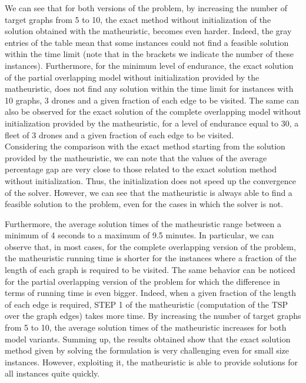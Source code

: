 \documentclass[10pt,a4paper]{elsarticle}
\newcommand{\EN}[1]{{\color{black}#1}}
\begin{document}
We can see that for both versions of the problem, by increasing the number of target graphs from 5 to 10, the exact method without initialization of the solution obtained with the matheuristic, becomes even harder. Indeed, the gray entries of the table mean that some instances could not find a feasible solution within the time limit (note that in the brackets we indicate the number of these instances). 
\EN{Furthermore}, for the minimum level of endurance, the exact solution of the partial overlapping model without initialization provided by the matheuristic, does not find any solution within the time limit for instances with 10 graphs, 3 drones and a given fraction of each edge to be visited. The same can \EN{also} be observed for the exact solution of the complete overlapping model without initialization provided by the matheuristic, for a level of endurance equal to 30, a fleet of 3 drones and a given fraction of each edge to be visited.\\
Considering the comparison with the exact method starting from the solution provided by the matheuristic, we can note that the values of the average percentage gap are very close to \EN{those} related to the exact solution method without initialization. Thus, the initialization does not speed up the convergence of the solver. However, we can see that the matheuristic is always able to find a feasible solution \EN{to} the problem, even for the cases in which the solver is not. 


\noindent
Furthermore, the average solution times of the matheuristic range between a minimum of 4 seconds to a maximum of 9.5 minutes. In particular, we can observe that, in most cases, for the complete overlapping version of the problem, the matheuristic running time is shorter for the instances where a fraction of the length of each graph is required to be visited. The same \EN{behavior} can be noticed for the partial overlapping version of the problem for which the difference in terms of running time is even bigger. Indeed, when a given fraction of the length of each edge is required, STEP 1 of the matheuristic (computation of the TSP over the graph edges) takes more time. By increasing the number of target graphs from 5 to 10, the average solution times of the matheuristic increases for both model variants.
Summing up, the results obtained show that the exact solution method given by solving the formulation is very challenging even for small size instances. However, exploiting it, the matheuristic is able to provide  solutions for all instances \EN{quite} quickly.
\end{document}
